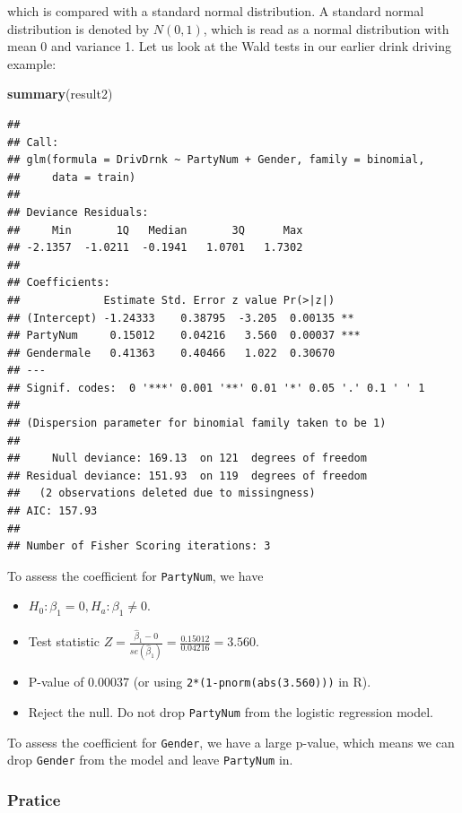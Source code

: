 \documentclass[
]{book}
\newenvironment{Shaded}{\begin{snugshade}}{\end{snugshade}}
\newcommand{\FunctionTok}[1]{\textcolor[rgb]{0.13,0.29,0.53}{\textbf{#1}}}
\newcommand{\NormalTok}[1]{#1}
\providecommand{\tightlist}{%
  \setlength{\itemsep}{0pt}\setlength{\parskip}{0pt}}
\begin{document}
which is compared with a standard normal distribution. A standard normal distribution is denoted by \(N(0,1)\), which is read as a normal distribution with mean 0 and variance 1. Let us look at the Wald tests in our earlier drink driving example:

\begin{Shaded}
\begin{Highlighting}[]
\FunctionTok{summary}\NormalTok{(result2)}
\end{Highlighting}
\end{Shaded}

\begin{verbatim}
## 
## Call:
## glm(formula = DrivDrnk ~ PartyNum + Gender, family = binomial, 
##     data = train)
## 
## Deviance Residuals: 
##     Min       1Q   Median       3Q      Max  
## -2.1357  -1.0211  -0.1941   1.0701   1.7302  
## 
## Coefficients:
##             Estimate Std. Error z value Pr(>|z|)    
## (Intercept) -1.24333    0.38795  -3.205  0.00135 ** 
## PartyNum     0.15012    0.04216   3.560  0.00037 ***
## Gendermale   0.41363    0.40466   1.022  0.30670    
## ---
## Signif. codes:  0 '***' 0.001 '**' 0.01 '*' 0.05 '.' 0.1 ' ' 1
## 
## (Dispersion parameter for binomial family taken to be 1)
## 
##     Null deviance: 169.13  on 121  degrees of freedom
## Residual deviance: 151.93  on 119  degrees of freedom
##   (2 observations deleted due to missingness)
## AIC: 157.93
## 
## Number of Fisher Scoring iterations: 3
\end{verbatim}

To assess the coefficient for \texttt{PartyNum}, we have

\begin{itemize}
\tightlist
\item
  \(H_0: \beta_1 = 0, H_a: \beta_1 \neq 0\).
\item
  Test statistic \(Z = \frac{\hat{\beta}_1 - 0}{se(\hat{\beta}_1)} = \frac{0.15012}{0.04216} = 3.560\).
\item
  P-value of 0.00037 (or using \texttt{2*(1-pnorm(abs(3.560)))} in R).
\item
  Reject the null. Do not drop \texttt{PartyNum} from the logistic regression model.
\end{itemize}

To assess the coefficient for \texttt{Gender}, we have a large p-value, which means we can drop \texttt{Gender} from the model and leave \texttt{PartyNum} in.

\hypertarget{pratice}{%
\subsubsection{Pratice}\label{pratice}}
\end{document}
